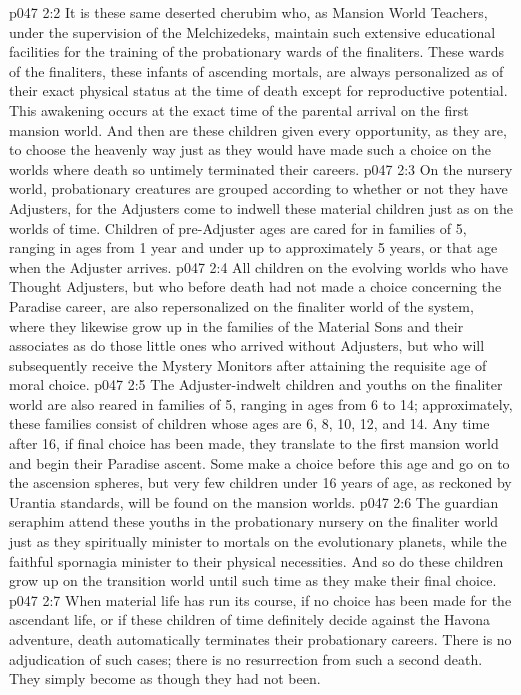 \vs p047 2:2 It is these same deserted cherubim who, as Mansion World Teachers, under the supervision of the Melchizedeks, maintain such extensive educational facilities for the training of the probationary wards of the finaliters. These wards of the finaliters, these infants of ascending mortals, are always personalized as of their exact physical status at the time of death except for reproductive potential. This awakening occurs at the exact time of the parental arrival on the first mansion world. And then are these children given every opportunity, as they are, to choose the heavenly way just as they would have made such a choice on the worlds where death so untimely terminated their careers.
\vs p047 2:3 On the nursery world, probationary creatures are grouped according to whether or not they have Adjusters, for the Adjusters come to indwell these material children just as on the worlds of time. Children of pre\hyp{}Adjuster ages are cared for in families of 5, ranging in ages from 1 year and under up to approximately 5 years, or that age when the Adjuster arrives.
\vs p047 2:4 All children on the evolving worlds who have Thought Adjusters, but who before death had not made a choice concerning the Paradise career, are also repersonalized on the finaliter world of the system, where they likewise grow up in the families of the Material Sons and their associates as do those little ones who arrived without Adjusters, but who will subsequently receive the Mystery Monitors after attaining the requisite age of moral choice.
\vs p047 2:5 The Adjuster\hyp{}indwelt children and youths on the finaliter world are also reared in families of 5, ranging in ages from 6 to 14; approximately, these families consist of children whose ages are 6, 8, 10, 12, and 14. Any time after 16, if final choice has been made, they translate to the first mansion world and begin their Paradise ascent. Some make a choice before this age and go on to the ascension spheres, but very few children under 16 years of age, as reckoned by Urantia standards, will be found on the mansion worlds.
\vs p047 2:6 The guardian seraphim attend these youths in the probationary nursery on the finaliter world just as they spiritually minister to mortals on the evolutionary planets, while the faithful spornagia minister to their physical necessities. And so do these children grow up on the transition world until such time as they make their final choice.
\vs p047 2:7 When material life has run its course, if no choice has been made for the ascendant life, or if these children of time definitely decide against the Havona adventure, death automatically terminates their probationary careers. There is no adjudication of such cases; there is no resurrection from such a second death. They simply become as though they had not been.
